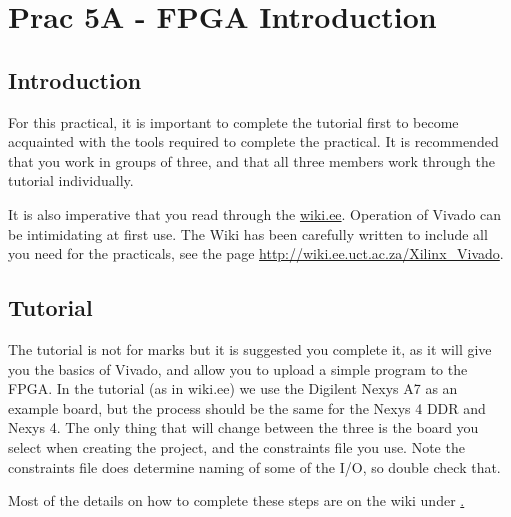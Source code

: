 \section{Prac 5A - FPGA Introduction}
\label{sec:Prac5}
\subsection{Introduction}
For this practical, it is important to complete the tutorial first to become acquainted with the tools required to complete the practical. It is recommended that you work in groups of three, and that all three members work through the tutorial individually.

It is also imperative that you read through the \href{http://wiki.ee.uct.ac.za/Main_Page}{wiki.ee}. Operation of Vivado can be intimidating at first use. The Wiki has been carefully written to include all you need for the practicals, see the page \href{http://wiki.ee.uct.ac.za/Xilinx_Vivado}{http://wiki.ee.uct.ac.za/Xilinx_Vivado}. 

\subsection{Tutorial}
The tutorial is not for marks but it is suggested you complete it, as it will give you the basics of Vivado, and allow you to upload a simple program to the FPGA. In the tutorial (as in wiki.ee) we use the Digilent Nexys A7 as an example board, but the process should be the same for the Nexys 4 DDR and Nexys 4. The only thing that will change between the three is the board you select when creating the project, and the constraints file you use. Note the constraints file does determine naming of some of the I/O, so double check that.

Most of the details on how to complete these steps are on the wiki under \href{http://wiki.ee.uct.ac.za/Xilinx_Vivado}.

